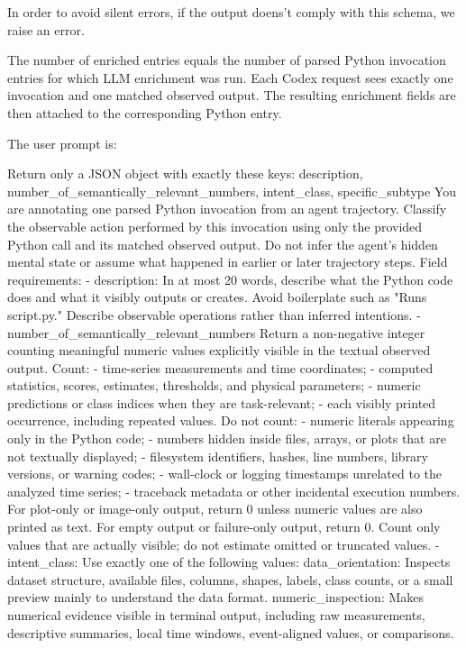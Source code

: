 \documentclass[11pt]{article}
\begin{document}
In order to avoid silent errors, if the output doens't comply with this schema, we raise an error.



The number of enriched entries equals the number of parsed Python invocation entries for which LLM enrichment was run.
Each Codex request sees exactly one invocation and one matched observed output.
The resulting enrichment fields are then attached to the corresponding Python  entry.

The user prompt is:
\begin{DocCode}
Return only a JSON object with exactly these keys:
description, number_of_semantically_relevant_numbers, intent_class, specific_subtype
You are annotating one parsed Python invocation from an agent trajectory.
Classify the observable action performed by this invocation using only the provided
Python call and its matched observed output.
Do not infer the agent's hidden mental state or assume what happened in earlier or later trajectory steps.
Field requirements:
- description:
  In at most 20 words, describe what the Python code does and what it visibly outputs or creates.
  Avoid boilerplate such as "Runs script.py."
  Describe observable operations rather than inferred intentions.
- number_of_semantically_relevant_numbers
  Return a non-negative integer counting meaningful numeric values explicitly visible in the textual observed output.
  Count:
  - time-series measurements and time coordinates;
  - computed statistics, scores, estimates, thresholds, and physical parameters;
  - numeric predictions or class indices when they are task-relevant;
  - each visibly printed occurrence, including repeated values.
  Do not count:
  - numeric literals appearing only in the Python code;
  - numbers hidden inside files, arrays, or plots that are not textually displayed;
  - filesystem identifiers, hashes, line numbers, library versions, or warning codes;
  - wall-clock or logging timestamps unrelated to the analyzed time series;
  - traceback metadata or other incidental execution numbers.
  For plot-only or image-only output, return 0 unless numeric values are also printed as text.
  For empty output or failure-only output, return 0.
  Count only values that are actually visible; do not estimate omitted or truncated values.
- intent_class:
  Use exactly one of the following values:
  data_orientation:
    Inspects dataset structure, available files, columns, shapes, labels, class counts, or a small preview mainly to understand the data format.
  numeric_inspection:
    Makes numerical evidence visible in terminal output, including raw measurements, descriptive summaries, local time windows, event-aligned values, or comparisons.

\end{DocCode}
\end{document}
